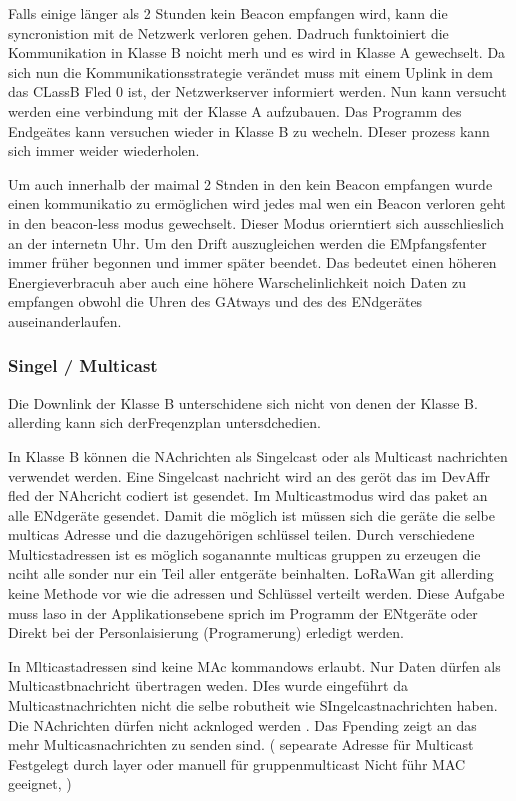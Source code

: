\documentclass[a4paper,12pt]{article}
\begin{document}
                Falls einige länger als 2 Stunden kein Beacon empfangen wird, kann die syncronistion mit de Netzwerk verloren gehen. Dadruch funktoiniert die Kommunikation in Klasse B noicht merh und es wird in Klasse A gewechselt. Da sich nun die 
                Kommunikationsstrategie verändet muss mit einem Uplink in dem das CLassB Fled 0 ist, der Netzwerkserver informiert werden. Nun kann versucht werden eine verbindung mit der Klasse A aufzubauen. Das Programm des Endgeätes kann versuchen
                wieder in Klasse B zu wecheln. DIeser prozess kann sich immer weider wiederholen.

                Um auch innerhalb der maimal 2 Stnden in den kein Beacon empfangen wurde einen kommunikatio zu ermöglichen wird jedes mal wen ein Beacon verloren geht in den beacon-less modus gewechselt. Dieser Modus orierntiert sich ausschlieslich an der internetn Uhr.
                Um den Drift auszugleichen werden die EMpfangsfenter immer früher begonnen und immer später beendet. Das bedeutet einen höheren Energieverbracuh aber auch eine höhere Warschelinlichkeit noich Daten zu empfangen obwohl die Uhren des GAtways und des des ENdgerätes auseinanderlaufen.

            \subsubsection{Singel / Multicast}
                Die Downlink der Klasse B unterschidene sich nicht von denen der Klasse B. allerding kann sich derFreqenzplan untersdchedien.
                
                In Klasse B können die NAchrichten als Singelcast oder als Multicast nachrichten verwendet werden. Eine Singelcast nachricht wird an des geröt das im DevAffr fled der NAhcricht codiert ist gesendet. Im Multicastmodus wird das paket an alle ENdgeräte gesendet.
                Damit die möglich ist müssen sich die geräte die selbe multicas Adresse und die dazugehörigen schlüssel teilen. Durch verschiedene Multicstadressen ist es möglich soganannte
                multicas gruppen zu erzeugen die nciht alle sonder nur ein Teil aller entgeräte beinhalten. LoRaWan git allerding keine Methode vor wie die adressen und Schlüssel verteilt werden. Diese Aufgabe muss laso in der Applikationsebene sprich im Programm der ENtgeräte oder Direkt bei der Personlaisierung (Programerung) erledigt werden.
                

                In Mlticastadressen sind keine MAc kommandows erlaubt. Nur Daten dürfen als Multicastbnachricht übertragen weden. DIes wurde eingeführt da Multicastnachrichten nicht die selbe robutheit wie SIngelcastnachrichten haben.
                Die NAchrichten dürfen nicht acknloged werden . Das Fpending zeigt an das mehr Multicasnachrichten zu senden sind.
                \cite{LoRaSpec}(
                    sepearate Adresse für Multicast
                    Festgelegt durch layer oder manuell für gruppenmulticast
                    Nicht führ MAC geeignet, 
                )
\end{document}
